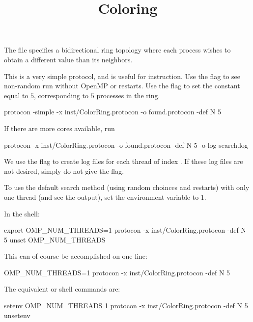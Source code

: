 
\title{Coloring}
\date{}



The  file specifies a bidirectional ring topology where each process wishes to obtain a different value than its neighbors.

This is a very simple protocol, and is useful for instruction.
Use the  flag to see non-random run without OpenMP or restarts.
Use the  flag to set the constant  equal to $5$, corresponding to $5$ processes in the ring.
\begin{code}
protocon -simple -x inst/ColorRing.protocon -o found.protocon -def N 5
\end{code}

If there are more cores available, run
\begin{code}
protocon -x inst/ColorRing.protocon -o found.protocon -def N 5 -o-log search.log
\end{code}
We use the  flag to create log files  for each thread of index .
If these log files are not desired, simply do not give the flag.

To use the default search method (using random choinces and restarts) with only one thread (and see the output), set the  environment variable to $1$.

In the  shell:
\begin{code}
export OMP_NUM_THREADS=1
protocon -x inst/ColorRing.protocon -def N 5
unset OMP_NUM_THREADS
\end{code}

This can of course be accomplished on one line:
\begin{code}
OMP_NUM_THREADS=1 protocon -x inst/ColorRing.protocon -def N 5
\end{code}
The equivalent  or  shell commands are:
\begin{code}
setenv OMP_NUM_THREADS 1
protocon -x inst/ColorRing.protocon -def N 5
unsetenv
\end{code}



